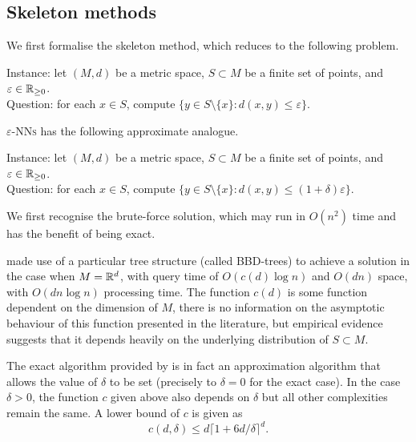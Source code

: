 \subsection{Skeleton methods}

We first formalise the skeleton method, which reduces to the following problem.

\begin{problem}
Instance: let $(M, d)$ be a metric space, $S \subset M$ be a finite set of points, and $\varepsilon \in \mathbb R_{\geq 0}$. \\
Question: for each $x \in S$, compute $\{y \in S \setminus \{x\}: d(x,y) \leq \varepsilon\}$.
\end{problem}

\textsc{$\varepsilon$-NNs} has the following approximate analogue.

\begin{problem}
Instance: let $(M, d)$ be a metric space, $S \subset M$ be a finite set of points, and $\varepsilon \in \mathbb R_{\geq 0}$. \\
Question: for each $x \in S$, compute $\{y \in S \setminus \{x\}: d(x, y) \leq (1 + \delta) \varepsilon\}$.
\end{problem}

We first recognise the brute-force solution, which may run in $O(n^2)$ time and has the benefit of being exact.

\textcite{arya1998optimal} made use of a particular tree structure (called BBD-trees) to achieve a solution in the case when $M = \mathbb R^d$, with query time of $O(c(d) \log n)$ and $O(dn)$ space, with $O(dn\log n)$ processing time. The function $c(d)$ is some function dependent on the dimension of $M$, there is no information on the asymptotic behaviour of this function presented in the literature, but empirical evidence suggests that it depends heavily on the underlying distribution of $S \subset M$.

The exact algorithm provided by \textcite{arya1998optimal} is in fact an approximation algorithm that allows the value of $\delta$ to be set (precisely to $\delta = 0$ for the exact case). In the case $\delta > 0$, the function $c$ given above also depends on $\delta$ but all other complexities remain the same. A lower bound of $c$ is given as
\[c(d, \delta) \leq d \lceil 1 + 6d/\delta \rceil^d. \]


